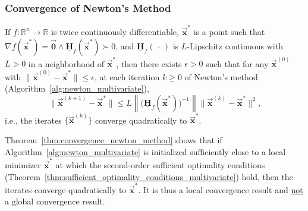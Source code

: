 \documentclass[9pt, headings=standardclasses, parskip=half]{scrartcl}
\renewcommand{\emph}[1]{\textcolor{mypurple}{#1}}
\newcommand{\matr}[1]{\underline{\boldsymbol{#1}}}
\newcommand{\vect}[1]{\vec{\boldsymbol{#1}}}
\begin{document}
\subsubsection{Convergence of Newton's Method}
\label{subsubsec:newton_convergence}

\begin{theorem}\label{thm:convergence_newton_method}
If \(f:\mathbb{R}^{n}\to\mathbb{R}\) is twice continuously differentiable, 
\(\vect{x}^{*}\) is a point such that \(\nabla f(\vect{x}^{*}) = \vect{0} \wedge \matr{H}_{f}(\vect{x}^{*}) \succ 0\),
and \(\matr{H}_{f}(\,\cdot \,)\) is \(L\)-Lipschitz continuous with \(L>0\) in a neighborhood of \(\vect{x}^{*}\),
then there exists \(\epsilon>0\) such that for any \(\vect{x}^{(0)}\) with \(\|\vect{x}^{(0)}-\vect{x}^{*}\| \leq \epsilon\), 
at each iteration \(k \geq 0\) of Newton's method (Algorithm~\ref{alg:newton_multivariate}), 
\begin{equation}
\label{eq:convergence_newton_method}
\big\|\vect{x}^{(k+1)}-\vect{x}^{*}\big\| \leq L\left\|\big(\matr{H}_{f}(\vect{x}^{*})\big)^{-1}\right\| \big\|\vect{x}^{(k)}-\vect{x}^{*}\big\|^{2} \text{,}
\end{equation}
i.e., the iterates \(\{\vect{x}^{(k)}\}\) converge quadratically to \(\vect{x}^{*}\).
\end{theorem}

\begin{remark}
Theorem~\ref{thm:convergence_newton_method} shows that if Algorithm~\ref{alg:newton_multivariate} is initialized sufficiently close to a local minimizer \(\vect{x}^{*}\) at which the second-order sufficient optimality conditions (Theorem~\ref{thm:sufficient_optimality_conditions_multivariate}) hold, then the iterates converge quadratically to \(\vect{x}^{*}\).
It is thus a \emph{local convergence} result and \underline{not} a global convergence result.
\end{remark}
\end{document}
